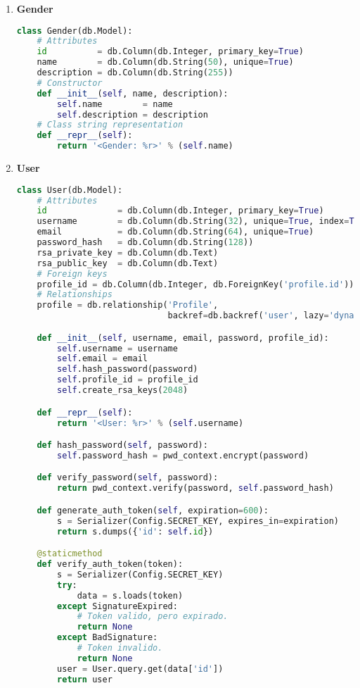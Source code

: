\begin{enumerate}
\item \textbf{Gender}
	
\begin{lstlisting}[language=Python]
class Gender(db.Model):
    # Attributes
    id          = db.Column(db.Integer, primary_key=True)
    name        = db.Column(db.String(50), unique=True)
    description = db.Column(db.String(255))
	# Constructor
    def __init__(self, name, description):
        self.name        = name
        self.description = description
	# Class string representation
    def __repr__(self):
        return '<Gender: %r>' % (self.name)
\end{lstlisting}
	
\item \textbf{User}
	
\begin{lstlisting}[language=Python]
class User(db.Model):
    # Attributes
    id              = db.Column(db.Integer, primary_key=True)
    username        = db.Column(db.String(32), unique=True, index=True)
    email           = db.Column(db.String(64), unique=True)
    password_hash   = db.Column(db.String(128))
    rsa_private_key = db.Column(db.Text)
    rsa_public_key  = db.Column(db.Text)
    # Foreign keys
    profile_id = db.Column(db.Integer, db.ForeignKey('profile.id'))
    # Relationships
    profile = db.relationship('Profile',
                              backref=db.backref('user', lazy='dynamic'))

    def __init__(self, username, email, password, profile_id):
        self.username = username
        self.email = email
        self.hash_password(password)
        self.profile_id = profile_id
        self.create_rsa_keys(2048)

    def __repr__(self):
        return '<User: %r>' % (self.username)

    def hash_password(self, password):
        self.password_hash = pwd_context.encrypt(password)

    def verify_password(self, password):
        return pwd_context.verify(password, self.password_hash)

    def generate_auth_token(self, expiration=600):
        s = Serializer(Config.SECRET_KEY, expires_in=expiration)
        return s.dumps({'id': self.id})

    @staticmethod
    def verify_auth_token(token):
        s = Serializer(Config.SECRET_KEY)
        try:
            data = s.loads(token)
        except SignatureExpired:
            # Token valido, pero expirado.
            return None
        except BadSignature:
            # Token invalido.
            return None
        user = User.query.get(data['id'])
        return user


\end{lstlisting}
\end{enumerate}
